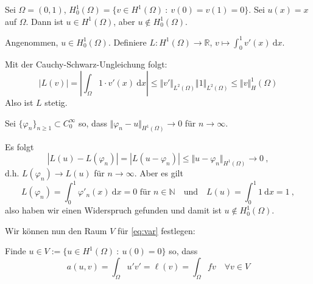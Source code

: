 \begin{bsp}
    Sei $\Omega = (0,1)$,  $H_0^1(\Omega) = \{ v \in H^1(\Omega) \ : \ v(0) = v(1) = 0 \}.$
    Sei $u(x) = x$ auf $\Omega$. Dann ist $u \in H^1(\Omega)$, aber $u \notin H_0^1(\Omega)$.

    Angenommen, $u \in H_0^1(\Omega)$. 
    Definiere $L: H^1(\Omega) \to \mathbb R$, $v \mapsto \int_0^1 v'(x) \ \mathrm dx$.
    
    Mit der Cauchy-Schwarz-Ungleichung folgt:
    \[
        |L(v)| = \left| \int_\Omega 1 \cdot v'(x) \ \mathrm dx \right|
            \leq \Vert v' \Vert_{L^2(\Omega)} \Vert 1 \Vert_{L^2(\Omega)}
            \leq \Vert v \Vert_H^1(\Omega)
    \]
    Also ist $L$ stetig.

    Sei $\{ \varphi_n \}_{n\geq 1} \subset C_0^\infty$ so, dass 
    $\Vert \varphi_n - u \Vert_{H^1(\Omega)} \to 0$ für $n \to \infty$.

    Es folgt
    \[ 
        |L(u) - L(\varphi_n) | = | L(u - \varphi_n) | \leq \Vert u - \varphi_n \Vert_{H^1(\Omega)} \to 0 \ ,
    \]
    d.h. $L(\varphi_n) \to L(u)$ für $n \to \infty$.
    Aber es gilt
    \[
        L(\varphi_n) = \int_0^1 \varphi'_n(x) \ \mathrm dx = 0 \text{ für } n \in \mathbb N \quad \text{und} \quad
        L(u) = \int_0^1 1 \ \mathrm dx = 1 \ ,
    \]
    also haben wir einen Widerspruch gefunden und damit ist $u \notin H_0^1(\Omega)$.
\end{bsp}

Wir können nun den Raum $V$ für \eqref{eq:var} festlegen:

Finde $u \in V := \{u \in H^1(\Omega) \ : \ u(0) = 0 \}$ so, dass
\[
    a(u,v) = \int_\Omega u' v' = \ell(v) = \int_\Omega f v \quad \forall v \in V
\]

